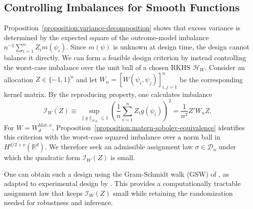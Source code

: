 \documentclass[letterpaper,12pt]{article}
\theoremstyle{definition}
\numberwithin{equation}{section}
\newcommand{\mr}{\mathbb{R}}
\newcommand{\mc}{\mathcal}
\newcommand{\norm}[1]{\lVert#1\rVert}
\begin{document}

\subsection{Controlling Imbalances for Smooth Functions}\label{subsection:unit-gsw}

Proposition~\ref{proposition:variance-decomposition} shows that excess variance is determined by the expected square of the outcome-model imbalance $n^{-1}\sum_{i=1}^nZ_im(\psi_i)$.
Since $m(\psi)$ is unknown at design time, the design cannot balance it directly.
We can form a feasible design criterion by instead controlling the worst-case imbalance over the unit ball of a chosen RKHS $\mc H_W$.
Consider an allocation $Z\in\{-1,1\}^n$ and let $W_n=[W(\psi_i,\psi_j)]_{i,j=1}^n$ be the corresponding kernel matrix.
By the reproducing property, one calculates imbalance
\begin{equation}\label{equation:rkhs-uniform-imbalance}
\mc I_W(Z) \equiv \sup_{\norm{g}_{\mc H_W}\leq1} \left(\frac1n\sum_{i=1}^nZ_ig(\psi_i)\right)^2 = \frac1{n^2}Z'W_nZ.
\end{equation}
For $W=W_d^{\mathrm{Mat},\nu}$, Proposition~\ref{proposition:matern-sobolev-equivalence} identifies this criterion with the worst-case squared imbalance over a norm ball in $H^{d/2+\nu}(\mr^d)$.
We therefore seek an admissible assignment law $\sigma \in \mc D_n$ under which the quadratic form $\mc I_W(Z)$ is small.

One can obtain such a design using the Gram-Schmidt walk (GSW) of \citet{bansal2019gram}, as adapted to experimental design by \citet{harshaw2024gsw}. This provides a computationally tractable assignment law that keeps $\mc I_W(Z)$ small while retaining the randomization needed for robustness and inference.
\end{document}
